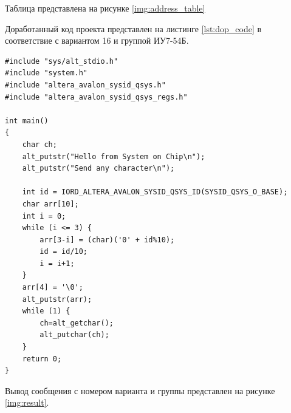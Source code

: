 Таблица представлена на рисунке \ref{img:address_table}
\begin{figure}[H]
	\captionsetup{justification=centering}
\end{figure}

\clearpage
Доработанный код проекта представлен на листинге \ref{lst:dop_code} в соответствие с вариантом 16 и группой ИУ7-54Б.
\captionsetup{singlelinecheck = false, justification=raggedright}
\begin{lstlisting}[label=lst:dop_code,caption=Код программного проекта Nios II Software Build Tools for Eclipse]
#include "sys/alt_stdio.h"
#include "system.h"
#include "altera_avalon_sysid_qsys.h"
#include "altera_avalon_sysid_qsys_regs.h"

int main()
{ 
	char ch;
	alt_putstr("Hello from System on Chip\n");
	alt_putstr("Send any character\n");
	
	int id = IORD_ALTERA_AVALON_SYSID_QSYS_ID(SYSID_QSYS_O_BASE);
	char arr[10];
	int i = 0;
	while (i <= 3) {
		arr[3-i] = (char)('0' + id%10);
		id = id/10;
		i = i+1;
	}
	arr[4] = '\0';
	alt_putstr(arr);
	while (1) {
		ch=alt_getchar();
		alt_putchar(ch);
	}
	return 0;
}
\end{lstlisting}
\clearpage

Вывод сообщения с номером варианта и группы представлен на рисунке \ref{img:result}.
\begin{figure}[H]
	\captionsetup{justification=centering}
\end{figure}